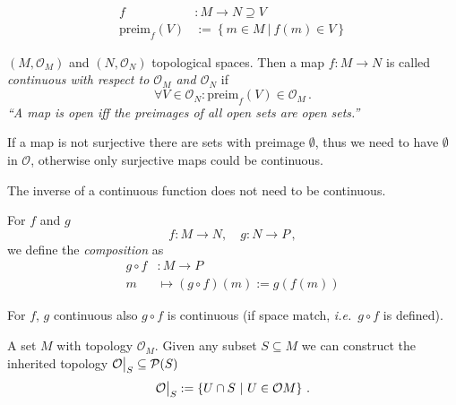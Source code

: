 \begin{defn}[Preimage]
    \begin{align}
        f&: M \to N \supseteq V \nonumber \\
        \text{preim}_f(V) &:= \left\{ m\in M~|~f(m) \in V \right\}
    \end{align}
\end{defn}

\begin{defn}[Continuity]
    $(M, \mathcal{O}_M)$ and $(N, \mathcal{O}_N)$ topological spaces.
    Then a map $f: M \to N$ is called \textit{continuous with respect to $\mathcal{O}_M$ and
    $\mathcal{O}_N$} if
    \begin{equation}
        \boxed{
    \forall V\in \mathcal{O}_N: \text{preim}_f(V) \in \mathcal{O}_M
}\,.
    \end{equation}
    \textit{``A map is open iff the preimages of all open sets are open sets.''}
\end{defn}

\begin{note}
    If a map is not surjective there are sets with preimage $\emptyset$, thus we need to have
    $\emptyset$ in $\mathcal{O}$, otherwise only surjective maps could be continuous.
\end{note}
\begin{note}
    The inverse of a continuous function does not need to be continuous.
\end{note}

\begin{defn}
    For $f$ and $g$
    \begin{equation*}
        f: M \to N, \quad g: N \to P\,,
    \end{equation*}
    we define the \textit{composition} as
    \begin{align}
        g \circ f&: M \to P \\
        m &\mapsto (g\circ f)(m) := g(f(m)) \nonumber
    \end{align}
\end{defn}

\begin{theorem}
    For $f$, $g$ continuous also $g\circ f$ is continuous (if space match, \textit{i.e.}\ $g\circ f$ is defined).
\end{theorem}


\begin{defn}
    A set $M$ with topology $\mathcal{O}_M$. Given any subset $S \subseteq M$ we
    can construct the inherited topology $\mathcal{O}\big|_S \subseteq \mathcal{P}(S)$
    \begin{equation}
        \mathcal{O}\big|_S := \left\{ U\cap S~|~U\in \mathcal{O}M \right\}\,.
    \end{equation}
\end{defn}

